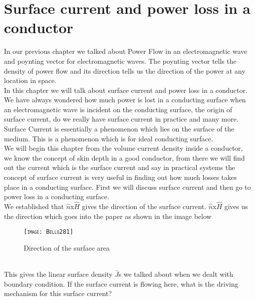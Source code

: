 \chapter{Surface current and power loss in a conductor}
In our previous chapter we talked about Power Flow in an electromagnetic wave and poynting vector for electromagnetic waves. The poynting vector tells the density of power flow and its direction tells us the direction of the power at any location in space.\\

In this chapter we will talk about surface current and power loss in a conductor.\\

We have always wondered how much power is lost in a conducting surface when an electromagnetic wave is incident on the conducting surface, the origin of surface current, do we really have surface current in practice and many more.\\

Surface Current is essentially a phenomenon which lies on the surface of the medium. This is a phenomenon which is for ideal conducting surface.\\

We will begin this chapter from the volume current density inside a conductor, we know the concept of skin depth in a good conductor, from there we will find out the current which is the surface current and say in practical systems the concept of surface current is very useful in finding out how much losses takes place in a conducting surface. First we will discuss surface current and then go to power loss in a conducting surface.\\

We established that $\hat{n}$x$\hat{H}$ gives the direction of the surface current. $\hat{n}$x$\hat{H}$ gives us the direction which goes into the paper as shown in the image below\\
\begin{figure}
\centering
\textsc{\texttt{[image: Bello281]}}
\caption{Direction of the surface area }
\end{figure}\\

This gives the linear surface density $\bar{J}$s we talked about when we dealt with boundary condition. If the surface current is flowing here, what is the driving mechanism for this surface current?\\

